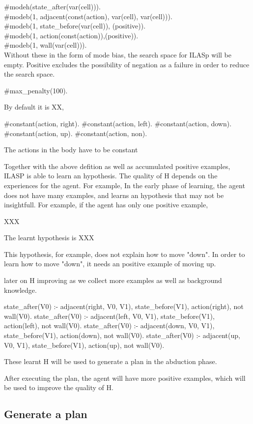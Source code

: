 \#modeh(state\_after(var(cell))). \\
\#modeb(1, adjacent(const(action), var(cell), var(cell))). \\
\#modeb(1, state\_before(var(cell)), (positive)). \\
\#modeb(1, action(const(action)),(positive)). \\
\#modeb(1, wall(var(cell))). \\

Without these in the form of mode bias, the search space for ILASp will be empty. 
Positive excludes the possibility of negation as a failure in order to reduce the search space.

\#max\_penalty(100).

By default it is XX, 

\#constant(action, right).
\#constant(action, left).
\#constant(action, down).
\#constant(action, up).
\#constant(action, non).

The actions in the body have to be constant

Together with the above defition as well as accumulated positive examples, ILASP is able to learn an hypothesis. The quality of H depends on the experiences for the agent. 
For example, In the early phase of learning, the agent does not have many examples, and learns an hypothesis that may not be insightfull. 
For example, if the agent has only one positive example, 

XXX

The learnt hypothesis is XXX

This hypothesis, for example, does not explain how to move "down". In order to learn how to move "down", it needs an positive example of moving up. 

later on H improving as we collect more examples as well as background knowledge.

state\_after(V0) :- adjacent(right, V0, V1), state\_before(V1), action(right), not wall(V0).
state\_after(V0) :- adjacent(left, V0, V1), state\_before(V1), action(left), not wall(V0).
state\_after(V0) :- adjacent(down, V0, V1), state\_before(V1), action(down), not wall(V0).
state\_after(V0) :- adjacent(up, V0, V1), state\_before(V1), action(up), not wall(V0).

These learnt H will be used to generate a plan in the abduction phase. 

After executing the plan, the agent will have more positive examples, which will be used to improve the quality of H. 

\subsection{Generate a plan}
\label{Generate a plan}

